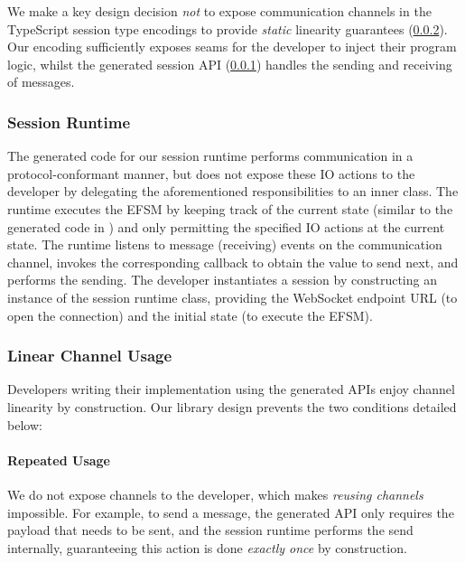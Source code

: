 We make a key design decision \textit{not} to expose communication channels in
the TypeScript session type encodings to provide \textit{static} linearity
guarantees (\cref{section:serverlinear}).
Our encoding sufficiently exposes seams for the developer to inject their
program logic, whilst the generated session API
(\cref{section:serversessionapi}) handles the sending and receiving of
messages.

\subsubsection{Session Runtime}
\label{section:serversessionapi}

The generated code for our session runtime performs communication in a protocol-conformant manner, but
does not expose these IO actions to the developer by delegating the
aforementioned responsibilities to an inner class.
The runtime executes the EFSM by keeping track of
the current state (similar to the generated code in \cite{javatypestate})
and only permitting the specified IO actions at the current state.
The runtime listens to message (receiving) events on the communication channel,
invokes the corresponding callback to obtain the value to send next, and
performs the sending.
The developer instantiates a session by constructing an instance of the
session runtime class, providing the WebSocket endpoint URL (to open the
connection) and the initial state (to execute the EFSM).

\subsubsection{Linear Channel Usage}
\label{section:serverlinear}

Developers writing their implementation using the generated APIs 
enjoy channel linearity by construction.
Our library design prevents the two conditions detailed below:

\paragraph{Repeated Usage}
We do not expose channels to the developer, which makes \textit{reusing
  channels} impossible.
For example, to send a message, the generated API only requires the payload
that needs to be sent, and the session runtime performs the send internally,
guaranteeing this action is done \textit{exactly once} by construction.

